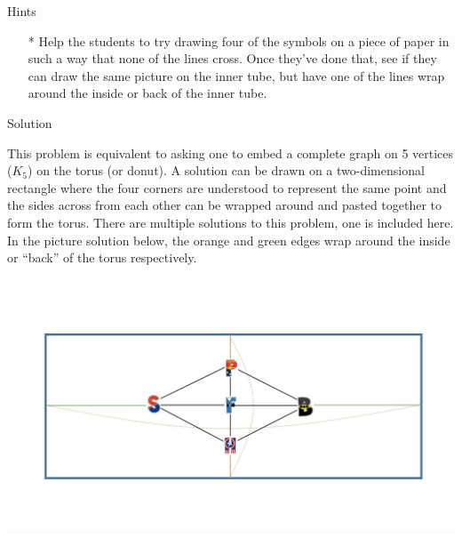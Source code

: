 

Hints
\begin{itemize}
\item[*] Help the students to try drawing four of the symbols on a piece of paper in such a way that none of the lines cross. Once they've done that, see if they can draw the same picture on the inner tube, but have one of the lines wrap around the inside or back of the inner tube.
\end{itemize}

Solution

This problem is equivalent to asking one to embed a complete graph on 5 vertices ($K_5$) on the torus (or donut). A solution can be drawn on a two-dimensional rectangle where the four corners are understood to represent the same point and the sides across from each other can be wrapped around and pasted together to form the torus. There are multiple solutions to this problem, one is included here. In the picture solution below, the orange and green edges wrap around the inside or ``back'' of the torus respectively.


    \includegraphics[width=\textwidth]{assets/kat/sol1}
